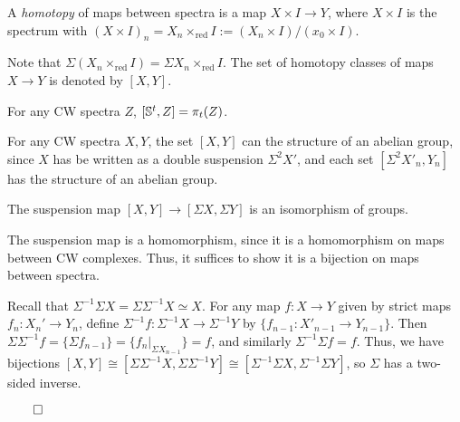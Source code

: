 \documentclass{MetricNotes2023}
\def\bb{\ensuremath\mathbb}
\def\done{\begin{flushright}\vspace{-4.35ex}\(\qed\)\end{flushright}}
\begin{document}
\begin{definition}
A \textit{homotopy} of maps between spectra is a map \(X\times I \to Y\), where \(X\times I\) is the spectrum with \((X\times I)_n=X_n\times_{\text{red}} I:= (X_n\times I)/(x_0\times I)\).
\end{definition}

Note that \(\Sigma(X_n\times_{\text{red}}I)=\Sigma X_n\times_{\text{red}}I\). The set of homotopy classes of maps \(X\to Y\) is denoted by \([X,Y]\). 

\begin{remark}
For any CW spectra \(Z\), \([\bb{S}^t, Z]=\pi_t(Z)\). %
\end{remark}

For any CW spectra \(X,Y\), the set \([X,Y]\) can the structure of an abelian group, since \(X\) has be written as a double suspension \(\Sigma^2X'\), and each set \([\Sigma^2X'_n, Y_n]\) has the structure of an abelian group. %

\begin{theorem}\label{2504151310}
The suspension map \([X,Y]\to [\Sigma X, \Sigma Y]\) is an isomorphism of groups.
\end{theorem}

\begin{ourproof}
The suspension map is a homomorphism, since it is a homomorphism on maps between CW complexes. Thus, it suffices to show it is a bijection on maps between spectra. 

Recall that \(\Sigma^{-1}\Sigma X=\Sigma\Sigma^{-1}X\simeq X\). For any map \(f : X \to Y\) given by strict maps \(f_n : X_n'\to Y_n\), define \(\Sigma^{-1}f : \Sigma^{-1}X \to \Sigma^{-1}Y\) by \(\{f_{n-1} : X'_{n-1}\to Y_{n-1}\}\). Then \(\Sigma\Sigma^{-1}f=\{\Sigma f_{n-1}\}=\{f_n|_{\Sigma X_{n-1}}\}=f\), and similarly \(\Sigma^{-1}\Sigma f =f\). Thus, we have bijections \([X,Y]\cong [\Sigma\Sigma^{-1}X, \Sigma\Sigma^{-1}Y]\cong [\Sigma^{-1}\Sigma X, \Sigma^{-1}\Sigma Y]\), so \(\Sigma\) has a two-sided inverse. \done
\end{ourproof}



\end{document}
